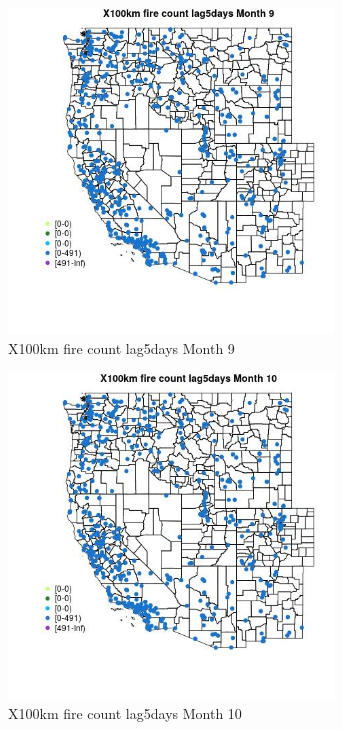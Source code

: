 \begin{figure} 
\centering  
\includegraphics[width=0.77\textwidth]{Code_Outputs/Report_ML_input_PM25_Step4_part_e_de_duplicated_aves_compiled_2019-05-14wNAs_MapObsMo9X100km_fire_count_lag5days.jpg} 
\caption{\label{fig:Report_ML_input_PM25_Step4_part_e_de_duplicated_aves_compiled_2019-05-14wNAsMapObsMo9X100km_fire_count_lag5days}X100km fire count lag5days Month 9} 
\end{figure} 
 

\begin{figure} 
\centering  
\includegraphics[width=0.77\textwidth]{Code_Outputs/Report_ML_input_PM25_Step4_part_e_de_duplicated_aves_compiled_2019-05-14wNAs_MapObsMo10X100km_fire_count_lag5days.jpg} 
\caption{\label{fig:Report_ML_input_PM25_Step4_part_e_de_duplicated_aves_compiled_2019-05-14wNAsMapObsMo10X100km_fire_count_lag5days}X100km fire count lag5days Month 10} 
\end{figure} 
 

